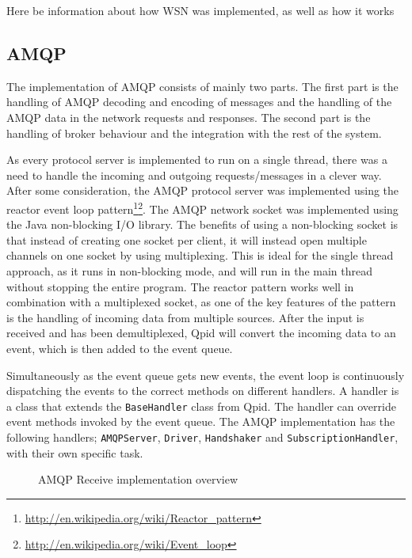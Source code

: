 Here be information about how WSN was implemented, as well as how it works

\subsection{AMQP}
\label{subsec:architecture_and_implementation-implementation-amqp}
The implementation of AMQP consists of mainly two parts. The first part is the handling of AMQP decoding and encoding of messages and the handling of the AMQP data in the network requests and responses. The second part is the handling of broker behaviour and the integration with the rest of the system. 

As every protocol server is implemented to run on a single thread, there was a need to handle the incoming and outgoing requests/messages in a clever way. After some consideration, the AMQP protocol server was implemented using the reactor event loop pattern\footnote{\url{http://en.wikipedia.org/wiki/Reactor_pattern}}\footnote{\url{http://en.wikipedia.org/wiki/Event_loop}}. 
The AMQP network socket was implemented using the Java non-blocking I/O library. The benefits of using a non-blocking socket is that instead of creating one socket per client, it will instead open multiple channels on one socket by using multiplexing. This is ideal for the single thread approach, as it runs in non-blocking mode, and will run in the main thread without stopping the entire program. The reactor pattern works well in combination with a multiplexed socket, as one of the key features of the pattern is the handling of incoming data from multiple sources. After the input is received and has been demultiplexed, Qpid will convert the incoming data to an event, which is then added to the event queue.

Simultaneously as the event queue gets new events, the event loop is continuously dispatching the events to the correct methods on different handlers. A handler is a class that extends the \verb!BaseHandler! class from Qpid. The handler can override event methods invoked by the event queue. The AMQP implementation has the following handlers; \verb!AMQPServer!, \verb!Driver!, \verb!Handshaker! and \verb!SubscriptionHandler!, with their own specific task.

\begin{center}
  \begin{figure}[ht!]
    \caption{AMQP Receive implementation overview}
    \label{fig:amqp_recv}
  \end{figure}
\end{center}

